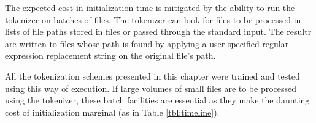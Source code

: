 The expected cost in initialization time is mitigated by the ability to run
the tokenizer on batches of files. The tokenizer can look for files to be
processed in lists of file paths stored in files or passed through the standard
input. The resultr are written to files whose path is found by applying a
user-specified regular expression replacement string on the original file's
path.

All the tokenization schemes presented in this chapter were trained and
tested using this way of execution. If large volumes of small files are to be
processed using the tokenizer, these batch facilities are essential as they
make the daunting cost of initialization marginal (as in Table
\ref{tbl:timeline}).
